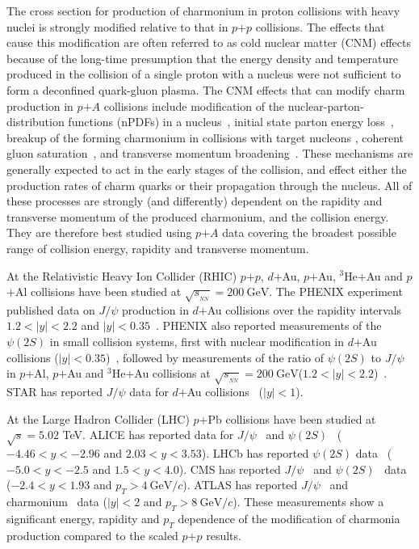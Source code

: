 \documentclass[twocolumn,letterpaper,aps,prc,longbibliography,superscriptaddress,nofootinbib,floatfix]{revtex4-1}
\newcommand{\pt}{\mbox{$p_T$}\xspace}
\newcommand{\sqsntwo}{\mbox{$\sqrt{s_{_{NN}}}=200~\mathrm{GeV}$}\xspace}
\newcommand{\pp}{\mbox{$p$$+$$p$}\xspace}
\newcommand{\pA}{\mbox{$p$$+$$A$}\xspace}
\newcommand{\dau}{\mbox{$d$$+$Au}\xspace}
\newcommand{\pau}{\mbox{$p$$+$Au}\xspace}
\newcommand{\pal}{\mbox{$p$$+$Al}\xspace}
\newcommand{\ppb}{\mbox{$p$$+$Pb}\xspace}
\newcommand{\heau}{\mbox{$^{3}$He$+$Au}\xspace}
\newcommand{\jpsi}{\mbox{$J/\psi$}\xspace}
\begin{document}
The cross section for production of charmonium in proton collisions with 
heavy nuclei is strongly modified relative to that in \pp collisions. 
The effects that cause this modification are often referred to as cold 
nuclear matter (CNM) effects because of the long-time presumption that 
the energy density and temperature produced in the collision of a single 
proton with a nucleus were not sufficient to form a deconfined 
quark-gluon plasma.  The CNM effects that can modify charm 
production in \pA collisions include modification of the 
nuclear-parton-distribution functions (nPDFs) in a nucleus~\cite{Eskola:2016oht, 
Kovarik:2015cma}, initial state parton energy loss~\cite{Vitev:2007ve}, 
breakup of the forming charmonium in collisions with target nucleons 
\cite{McGlinchey:2012bp, Arleo:1999af}, coherent gluon 
saturation~\cite{Kharzeev:2005zr, Fujii:2006ab}, and transverse momentum 
broadening~\cite{Cronin:1974zm}. These mechanisms are generally 
expected to act in the early stages of the collision, and effect either 
the production rates of charm quarks or their propagation through the 
nucleus.  All of these processes are strongly (and differently) 
dependent on the rapidity and transverse momentum of the produced 
charmonium, and the collision energy. They are therefore best studied 
using \pA data covering the broadest possible range of collision energy, 
rapidity and transverse momentum.

At the Relativistic Heavy Ion Collider (RHIC) \pp, \dau, \pau, \heau and 
\pal collisions have been studied at \sqsntwo. The PHENIX experiment 
published data on \jpsi production in \dau collisions over the rapidity 
intervals $1.2 < |y| < 2.2$ and $|y| < 0.35$~\cite{Adare:2013lkk, 
Adare:2012qf}. PHENIX also reported measurements of the $\psi(2S)$ in 
small collision systems, first with nuclear modification in $d$$+$Au 
collisions ($|y|<0.35$)~\cite{Adare:2013ezl}, followed by measurements 
of the ratio of $\psi(2S)$ to $J/\psi$ in \pal, \pau and \heau collisions 
at \sqsntwo ($1.2<|y|<2.2$)~\cite{Adare:2016psx}. STAR has reported 
\jpsi data for \dau collisions~\cite{Adamczyk:2016dhc} ($|y|<1$).

At the Large Hadron Collider (LHC) \ppb collisions have been studied at 
$\sqrt{s} = 5.02$ TeV. ALICE has reported data for 
\jpsi~\cite{Abelev:2013yxa, Adam:2015jsa} and 
$\psi(2S)$~\cite{Abelev:2014zpa, Adam:2016ohd} ($-4.46 < y < -2.96$ and 
$2.03 < y < 3.53$). LHCb has reported $\psi(2S)$ 
data~\cite{Aaij:2016eyl} ($-5.0 < y < -2.5$ and $1.5<y<4.0$). CMS has 
reported \jpsi~\cite{Sirunyan:2017mzd} and 
$\psi(2S)$~\cite{Sirunyan:2018pse} data ($-2.4 < y < 1.93$ and $p_T > 
4~\mathrm{GeV}/c$). ATLAS has reported \jpsi~\cite{Aad:2015ddl} and 
charmonium~\cite{Aaboud:2017cif} data ($|y| < 2$ and $p_T > 
8~\mathrm{GeV}/c$).  These measurements show a significant energy, 
rapidity and \pt dependence of the modification of charmonia 
production compared to the scaled \pp results.
\end{document}
